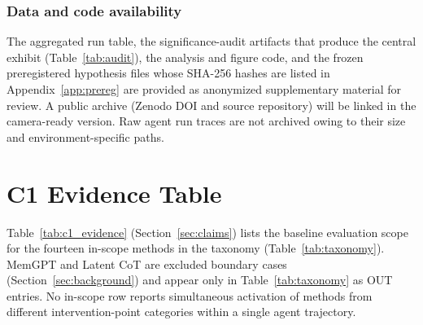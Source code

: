 \documentclass{article}
\newif\ifanon\anontrue
\begin{document}
\subsubsection*{Data and code availability}
\ifanon
The aggregated run table, the significance-audit artifacts that produce the central exhibit (Table~\ref{tab:audit}), the analysis and figure code, and the frozen preregistered hypothesis files whose SHA-256 hashes are listed in Appendix~\ref{app:prereg} are provided as anonymized supplementary material for review. A public archive (Zenodo DOI and source repository) will be linked in the camera-ready version. Raw agent run traces are not archived owing to their size and environment-specific paths.
\else
The aggregated run table, the significance-audit artifacts that produce the central exhibit (Table~\ref{tab:audit}), the analysis and figure-generation code, and the frozen preregistered hypothesis files whose SHA-256 hashes are listed in Appendix~\ref{app:prereg} are archived at Zenodo, \url{https://doi.org/10.5281/zenodo.21715347}~\citep{cab_dataset2026}, and mirrored in a public source repository. The confirmatory estimands and the full measurement audit of Section~\ref{sec:audit} reproduce byte-for-byte from the raw run traces through the archived extraction and bootstrap pipeline. Raw agent run traces are not archived owing to their size and environment-specific paths.
\fi

\ifanon\else
\subsubsection*{Author contributions}
Soumitra Mehrotra conceived the study, designed and conducted the experiments, performed the analysis, and wrote the manuscript. Shubhender Singh contributed to the taxonomy framing, reviewed the structural claims and composition-study interpretation, and revised the manuscript. Saurabh Aggarwal contributed to the related-work synthesis, reviewed the evidence-audit tables and experimental methodology, and revised the manuscript.
\fi

\appendix

\section{C1 Evidence Table}
\label{app:c1}

Table~\ref{tab:c1_evidence} (Section~\ref{sec:claims}) lists the baseline evaluation scope for the fourteen in-scope methods in the taxonomy (Table~\ref{tab:taxonomy}). MemGPT and Latent CoT are excluded boundary cases (Section~\ref{sec:background}) and appear only in Table~\ref{tab:taxonomy} as OUT entries. No in-scope row reports simultaneous activation of methods from different intervention-point categories within a single agent trajectory.
\end{document}
